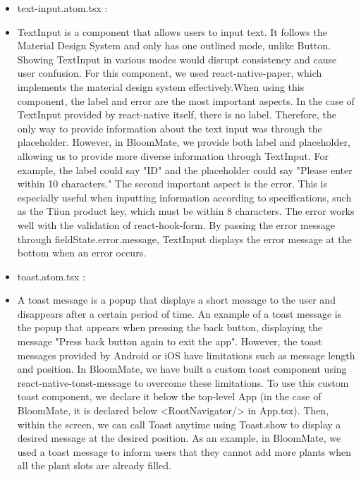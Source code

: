 \documentclass[conference, a4paper]{IEEEtran}
\begin{document}
\begin{enumerate}
\begin{enumerate}
\begin{itemize}
        \item text-input.atom.tsx :
        \item[] TextInput is a component that allows users to input text. It follows the Material Design System and only has one outlined mode, unlike Button. Showing TextInput in various modes would disrupt consistency and cause user confusion. For this component, we used react-native-paper, which implements the material design system effectively.When using this component, the label and error are the most important aspects. In the case of TextInput provided by react-native itself, there is no label. Therefore, the only way to provide information about the text input was through the placeholder. However, in BloomMate, we provide both label and placeholder, allowing us to provide more diverse information through TextInput. For example, the label could say "ID" and the placeholder could say "Please enter within 10 characters." The second important aspect is the error. This is especially useful when inputting information according to specifications, such as the Tiiun product key, which must be within 8 characters. The error works well with the validation of react-hook-form. By passing the error message through fieldState.error.message, TextInput displays the error message at the bottom when an error occurs. \\

        \item toast.atom.tsx : 
        \item[]  A toast message is a popup that displays a short message to the user and disappears after a certain period of time. An example of a toast message is the popup that appears when pressing the back button, displaying the message "Press back button again to exit the app". However, the toast messages provided by Android or iOS have limitations such as message length and position. In BloomMate, we have built a custom toast component using react-native-toast-message to overcome these limitations. To use this custom toast component, we declare it below the top-level App (in the case of BloomMate, it is declared below <RootNavigator/> in App.tsx). Then, within the screen, we can call Toast anytime using Toast.show to display a desired message at the desired position. As an example, in BloomMate, we used a toast message to inform users that they cannot add more plants when all the plant slots are already filled. \\
    \end{itemize}


\end{enumerate}
\end{enumerate}
\end{document}
